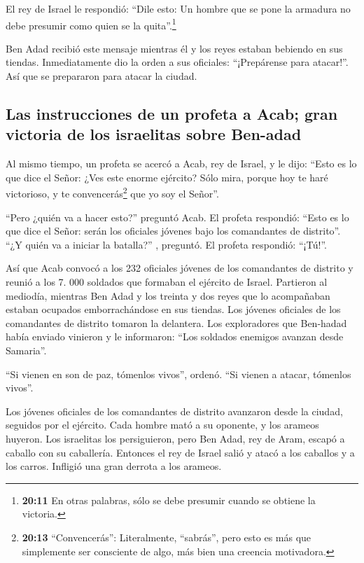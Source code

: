  El rey de Israel le respondió: ``Dile esto: Un hombre
que se pone la armadura no debe presumir como quien se la
quita''.\footnote{\textbf{20:11} En otras palabras, sólo se debe
  presumir cuando se obtiene la victoria.}

 Ben Adad recibió este mensaje mientras él y los reyes
estaban bebiendo en sus tiendas. Inmediatamente dio la orden a sus
oficiales: ``¡Prepárense para atacar!''. Así que se prepararon para
atacar la ciudad.

\hypertarget{las-instrucciones-de-un-profeta-a-acab-gran-victoria-de-los-israelitas-sobre-ben-adad}{%
\subsection{Las instrucciones de un profeta a Acab; gran victoria de los
israelitas sobre
Ben-adad}\label{las-instrucciones-de-un-profeta-a-acab-gran-victoria-de-los-israelitas-sobre-ben-adad}}

 Al mismo tiempo, un profeta se acercó a Acab, rey de
Israel, y le dijo: ``Esto es lo que dice el Señor: ¿Ves este enorme
ejército? Sólo mira, porque hoy te haré victorioso, y te
convencerás\footnote{\textbf{20:13} ``Convencerás'': Literalmente,
  ``sabrás'', pero esto es más que simplemente ser consciente de algo,
  más bien una creencia motivadora.} que yo soy el Señor''.

 ``Pero ¿quién va a hacer esto?'' preguntó Acab. El
profeta respondió: ``Esto es lo que dice el Señor: serán los oficiales
jóvenes bajo los comandantes de distrito''. ``¿Y quién va a iniciar la
batalla?'' , preguntó. El profeta respondió: ``¡Tú!''.

 Así que Acab convocó a los 232 oficiales jóvenes de los
comandantes de distrito y reunió a los 7. 000 soldados que formaban el
ejército de Israel.  Partieron al mediodía, mientras Ben
Adad y los treinta y dos reyes que lo acompañaban estaban ocupados
emborrachándose en sus tiendas.  Los jóvenes oficiales de
los comandantes de distrito tomaron la delantera. Los exploradores que
Ben-hadad había enviado vinieron y le informaron: ``Los soldados
enemigos avanzan desde Samaria''.

 ``Si vienen en son de paz, tómenlos vivos'', ordenó.
``Si vienen a atacar, tómenlos vivos''.

 Los jóvenes oficiales de los comandantes de distrito
avanzaron desde la ciudad, seguidos por el ejército. 
Cada hombre mató a su oponente, y los arameos huyeron. Los israelitas
los persiguieron, pero Ben Adad, rey de Aram, escapó a caballo con su
caballería.  Entonces el rey de Israel salió y atacó a
los caballos y a los carros. Infligió una gran derrota a los arameos.

